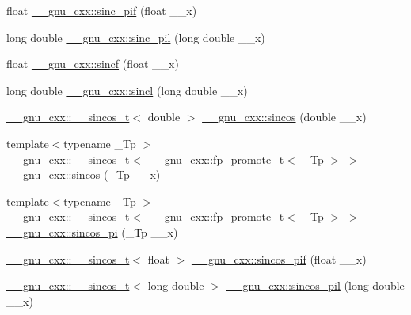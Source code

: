 \begin{DoxyCompactItemize}
\item 
float \hyperlink{group__gnu__math__spec__func_gad92d43d5332c80d1a27c90bfe3f6417e}{\+\_\+\+\_\+gnu\+\_\+cxx\+::sinc\+\_\+pif} (float \+\_\+\+\_\+x)
\item 
long double \hyperlink{group__gnu__math__spec__func_gaad38a6e40b1272391a26dbb32a684b3c}{\+\_\+\+\_\+gnu\+\_\+cxx\+::sinc\+\_\+pil} (long double \+\_\+\+\_\+x)
\item 
float \hyperlink{group__gnu__math__spec__func_gaa87f0734cfe7823c932511ac2f0a876c}{\+\_\+\+\_\+gnu\+\_\+cxx\+::sincf} (float \+\_\+\+\_\+x)
\item 
long double \hyperlink{group__gnu__math__spec__func_ga79a8fd931f5ad4f737e2931e636149ac}{\+\_\+\+\_\+gnu\+\_\+cxx\+::sincl} (long double \+\_\+\+\_\+x)
\item 
\hyperlink{struct____gnu__cxx_1_1____sincos__t}{\+\_\+\+\_\+gnu\+\_\+cxx\+::\+\_\+\+\_\+sincos\+\_\+t}$<$ double $>$ \hyperlink{group__gnu__math__spec__func_ga8041c24b528475bcf8a4178e484652a3}{\+\_\+\+\_\+gnu\+\_\+cxx\+::sincos} (double \+\_\+\+\_\+x)
\item 
{\footnotesize template$<$typename \+\_\+\+Tp $>$ }\\\hyperlink{struct____gnu__cxx_1_1____sincos__t}{\+\_\+\+\_\+gnu\+\_\+cxx\+::\+\_\+\+\_\+sincos\+\_\+t}$<$ \+\_\+\+\_\+gnu\+\_\+cxx\+::fp\+\_\+promote\+\_\+t$<$ \+\_\+\+Tp $>$ $>$ \hyperlink{group__gnu__math__spec__func_ga5d3a375ada451e0a9a78441ddfcf52a3}{\+\_\+\+\_\+gnu\+\_\+cxx\+::sincos} (\+\_\+\+Tp \+\_\+\+\_\+x)
\item 
{\footnotesize template$<$typename \+\_\+\+Tp $>$ }\\\hyperlink{struct____gnu__cxx_1_1____sincos__t}{\+\_\+\+\_\+gnu\+\_\+cxx\+::\+\_\+\+\_\+sincos\+\_\+t}$<$ \+\_\+\+\_\+gnu\+\_\+cxx\+::fp\+\_\+promote\+\_\+t$<$ \+\_\+\+Tp $>$ $>$ \hyperlink{group__gnu__math__spec__func_ga6553883f127ea0de67041c3128e03813}{\+\_\+\+\_\+gnu\+\_\+cxx\+::sincos\+\_\+pi} (\+\_\+\+Tp \+\_\+\+\_\+x)
\item 
\hyperlink{struct____gnu__cxx_1_1____sincos__t}{\+\_\+\+\_\+gnu\+\_\+cxx\+::\+\_\+\+\_\+sincos\+\_\+t}$<$ float $>$ \hyperlink{group__gnu__math__spec__func_gacf416c867a8a456f8f0e3d8b45ca8bd5}{\+\_\+\+\_\+gnu\+\_\+cxx\+::sincos\+\_\+pif} (float \+\_\+\+\_\+x)
\item 
\hyperlink{struct____gnu__cxx_1_1____sincos__t}{\+\_\+\+\_\+gnu\+\_\+cxx\+::\+\_\+\+\_\+sincos\+\_\+t}$<$ long double $>$ \hyperlink{group__gnu__math__spec__func_ga1f1efc07313a3de1e994d89c3b83b957}{\+\_\+\+\_\+gnu\+\_\+cxx\+::sincos\+\_\+pil} (long double \+\_\+\+\_\+x)

\end{DoxyCompactItemize}
